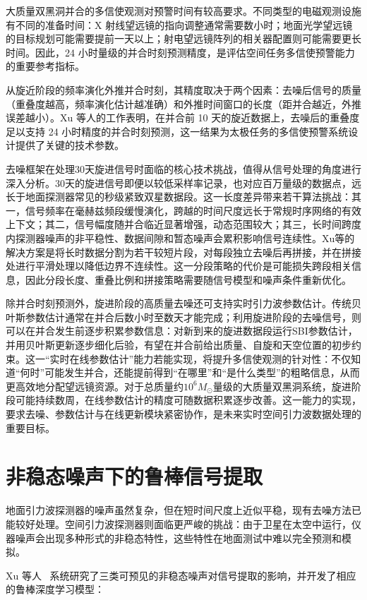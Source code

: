 大质量双黑洞并合的多信使观测对预警时间有较高要求。不同类型的电磁观测设施有不同的准备时间：X 射线望远镜的指向调整通常需要数小时；地面光学望远镜的目标规划可能需要提前一天以上；射电望远镜阵列的相关器配置则可能需要更长时间。因此，24 小时量级的并合时刻预测精度，是评估空间任务多信使预警能力的重要参考指标。

从旋近阶段的频率演化外推并合时刻，其精度取决于两个因素：去噪后信号的质量（重叠度越高，频率演化估计越准确）和外推时间窗口的长度（距并合越近，外推误差越小）。Xu 等人的工作表明，在并合前 10 天的旋近数据上，去噪后的重叠度足以支持 24 小时精度的并合时刻预测，这一结果为太极任务的多信使预警系统设计提供了关键的技术参数。

去噪框架在处理30天旋进信号时面临的核心技术挑战，值得从信号处理的角度进行深入分析。30天的旋进信号即便以较低采样率记录，也对应百万量级的数据点，远长于地面探测器常见的秒级紧致双星数据段。这一长度差异带来若干算法挑战：其一，信号频率在毫赫兹频段缓慢演化，跨越的时间尺度远长于常规时序网络的有效上下文；其二，信号幅度随并合临近显著增强，动态范围较大；其三，长时间跨度内探测器噪声的非平稳性、数据间隙和暂态噪声会累积影响信号连续性。Xu等的解决方案是将长时数据分割为若干较短片段，对每段独立去噪后再拼接，并在拼接处进行平滑处理以降低边界不连续性。这一分段策略的代价是可能损失跨段相关信息，因此分段长度、重叠比例和拼接策略需要随信号模型和噪声条件重新优化。

除并合时刻预测外，旋进阶段的高质量去噪还可支持实时引力波参数估计。传统贝叶斯参数估计通常在并合后数小时至数天才能完成；利用旋进阶段的去噪信号，则可以在并合发生前逐步积累参数信息：对新到来的旋进数据段运行SBI参数估计，并用贝叶斯更新逐步细化后验，有望在并合前给出质量、自旋和天空位置的初步约束。这一“实时在线参数估计”能力若能实现，将提升多信使观测的针对性：不仅知道“何时”可能发生并合，还能提前得到“在哪里”和“是什么类型”的粗略信息，从而更高效地分配望远镜资源。对于总质量约$10^6 M_\odot$量级的大质量双黑洞系统，旋进阶段可能持续数周，在线参数估计的精度可随数据积累逐步改善。这一能力的实现，要求去噪、参数估计与在线更新模块紧密协作，是未来实时空间引力波数据处理的重要目标。

\section{非稳态噪声下的鲁棒信号提取}

地面引力波探测器的噪声虽然复杂，但在短时间尺度上近似平稳，现有去噪方法已能较好处理。空间引力波探测器则面临更严峻的挑战：由于卫星在太空中运行，仪器噪声会出现多种形式的非稳态特性，这些特性在地面测试中难以完全预测和模拟。

Xu 等人~\cite{xu2024nonstationarty} 系统研究了三类可预见的非稳态噪声对信号提取的影响，并开发了相应的鲁棒深度学习模型：

